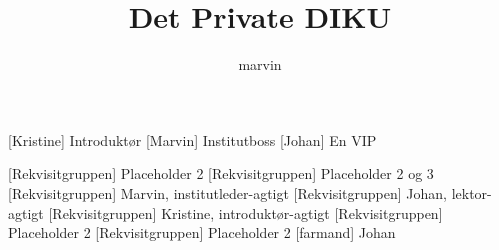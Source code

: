 \documentclass[a4paper,11pt]{article}
\title{Det Private DIKU}
\author{marvin}
\begin{document}
\maketitle

\begin{roles}
[Kristine] Introduktør
[Marvin] Institutboss
[Johan] En VIP
\end{roles}

\begin{props}
[Rekvisitgruppen] Placeholder 2
[Rekvisitgruppen] Placeholder 2 og 3
[Rekvisitgruppen] Marvin, institutleder-agtigt
[Rekvisitgruppen] Johan, lektor-agtigt
[Rekvisitgruppen] Kristine, introduktør-agtigt
[Rekvisitgruppen] Placeholder 2
[Rekvisitgruppen] Placeholder 2
[farmand] Johan
\end{props}
\end{document}
